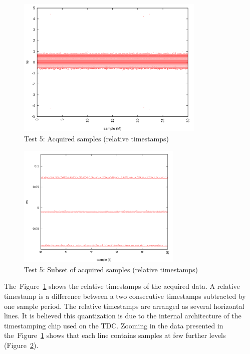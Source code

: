 \documentclass[a4paper, 12pt]{article}
\begin{document}
\FloatBarrier

\begin{figure}[ht!]
  \centering
  \includegraphics[width=0.8\textwidth]{img/test5_samples_relative.png}
  \caption{Test 5: Acquired samples (relative timestamps)}
  \label{test5_relative}
\end{figure}

\begin{figure}[ht!]
  \centering
  \includegraphics[width=0.7\textwidth]{img/test5_samples_relative_zoomxy.png}
  \caption{Test 5: Subset of acquired samples (relative timestamps)}
  \label{test5_relative_zoomy}
\end{figure}

The~Figure~\ref{test5_relative} shows the relative timestamps of the acquired
data.
A relative timestamp is a difference between a two consecutive timestamps
subtracted by one sample period.
The relative timestamps are arranged as several horizontal lines.
It is believed this quantization is due to the internal architecture of
the timestamping chip used on the TDC.
Zooming in the data presented in the~Figure~\ref{test5_relative} shows that each
line contains samples at few further levels (Figure~\ref{test5_relative_zoomy}).
\end{document}
